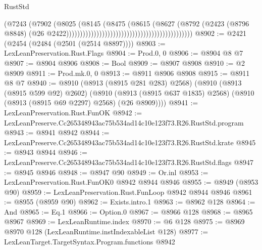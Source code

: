 \begin{lexlean}{RustStd}
\begin{coremodule}
                                                                            (@7243
                                                                              (@7902
                                                                                (@8025
                                                                                  (@8145
                                                                                    (@8475
                                                                                      (@8615
                                                                                        (@8627
                                                                                          (@8792
                                                                                            (@2423
                                                                                              (@8796
                                                                                                @8848)
                                                                                              (@26
                                                                                                @2422))))))))))))))))))))))))))))))))))))))))))))))
@8902 := @2421 (@2454 (@2484 (@2501 (@2514 @8897))))
@8903 := LexLeanPreservation.Rust.Flags
@8904 := Prod.{0, 0}
@8906 := @8904 @8 @7
@8907 := @8904 @8906
@8908 := Bool
@8909 := @8907 @8908
@8910 := @2 @8909
@8911 := Prod.mk.{0, 0}
@8913 := @8911 @8906 @8908
@8915 := @8911 @8 @7
@8940 := @8910
    (@8913 (@8915 @281 @283) @2568)
    (@8910
      (@8913 (@8915 @599 @92) @2602)
      (@8910 (@8913 (@8915 @637 @1835) @2568) (@8910 (@8913 (@8915 @69 @2297) @2568) (@26 @8909))))
@8941 := LexLeanPreservation.Rust.FunOK
@8942 := LexLeanPreserve.Cc265348943ac75b534ad14c10e123f73.R26.RustStd.program
@8943 := @8941 @8942
@8944 := LexLeanPreserve.Cc265348943ac75b534ad14c10e123f73.R26.RustStd.krate
@8945 := @8943 @8944
@8946 := LexLeanPreserve.Cc265348943ac75b534ad14c10e123f73.R26.RustStd.flags
@8947 := @8945 @8946
@8948 := @8947 @90
@8949 := Or.inl
@8953 := LexLeanPreservation.Rust.FunOK0 @8942 @8944 @8946
@8955 := @8949 (@8953 @90)
@8959 := LexLeanPreservation.Rust.FunLoop @8942 @8944 @8946
@8961 := @8955 (@8959 @90)
@8962 := Exists.intro.{1}
@8963 := @8962 @128
@8964 := And
@8965 := Eq.{1}
@8966 := Option.{0}
@8967 := @8966 @128
@8968 := @8965 @8967
@8969 := LexLeanRuntime.index
@8970 := @6 @128
@8975 := @8969 @8970 @128 (LexLeanRuntime.instIndexableList @128)
@8977 := LexLeanTarget.TargetSyntax.Program.functions @8942

\end{coremodule}
\end{lexlean}
